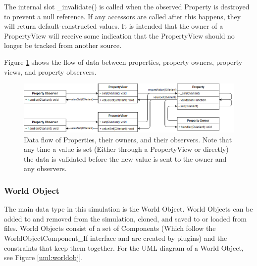  	The internal slot \_invalidate() is called when the observed Property is destroyed to prevent a null reference. If any accessors are called after this happens, they will return default-constructed values. It is intended that the owner of a PropertyView will receive some indication that the PropertyView should no longer be tracked from another source.
 	
 	Figure \ref{uml:dataflow_property} shows the flow of data between properties, property owners, property views, and property observers.
 	
 \begin{figure}[h]
 	\begin{center}
 	\includegraphics[scale=0.5]{./images_design/uml/DataFlow_Property}
 	\caption{Data flow of Properties, their owners, and their observers. Note that any time a value is set (Either through a PropertyView or directly) the data is validated before the new value is sent to the owner and any observers.\label{uml:dataflow_property}}
 	\end{center}
 \end{figure} 
 	
  \subsubsection*{World Object} \label{sec:worldobjclass}
	The main data type in this simulation is the World Object. World Objects can be added to and removed from the simulation, cloned, and saved to or loaded from files. World Objects consist of a set of Components (Which follow the WorldObjectComponent\_If interface and are created by plugins) and the constraints that keep them together. For the UML diagram of a World Object, see Figure \ref{uml:worldobj}.
	
